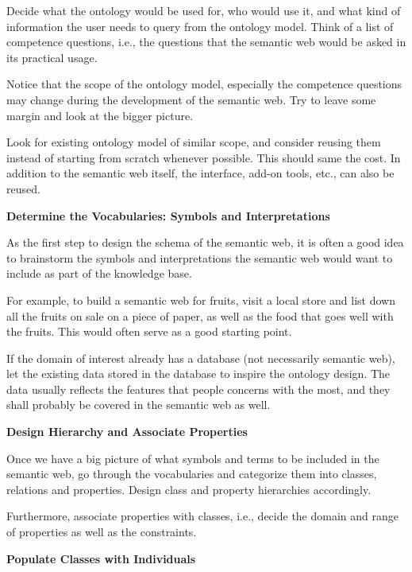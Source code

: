 Decide what the ontology would be used for, who would use it, and what kind of information the user needs to query from the ontology model. Think of a list of competence questions, i.e., the questions that the semantic web would be asked in its practical usage.

Notice that the scope of the ontology model, especially the competence questions may change during the development of the semantic web. Try to leave some margin and look at the bigger picture.

Look for existing ontology model of similar scope, and consider reusing them instead of starting from scratch whenever possible. This should same the cost. In addition to the semantic web itself, the interface, add-on tools, etc., can also be reused.

\vspace{0.1in}
\noindent \textbf{Determine the Vocabularies: Symbols and Interpretations}
\vspace{0.1in}

As the first step to design the schema of the semantic web, it is often a good idea to brainstorm the symbols and interpretations the semantic web would want to include as part of the knowledge base.

For example, to build a semantic web for fruits, visit a local store and list down all the fruits on sale on a piece of paper, as well as the food that goes well with the fruits. This would often serve as a good starting point.

If the domain of interest already has a database (not necessarily semantic web), let the existing data stored in the database to inspire the ontology design. The data usually reflects the features that people concerns with the most, and they shall probably be covered in the semantic web as well.

\vspace{0.1in}
\noindent \textbf{Design Hierarchy and Associate Properties}
\vspace{0.1in}

Once we have a big picture of what symbols and terms to be included in the semantic web, go through the vocabularies and categorize them into classes, relations and properties. Design class and property hierarchies accordingly. 

Furthermore, associate properties with classes, i.e., decide the domain and range of properties as well as the constraints.

\vspace{0.1in}
\noindent \textbf{Populate Classes with Individuals}
\vspace{0.1in}

